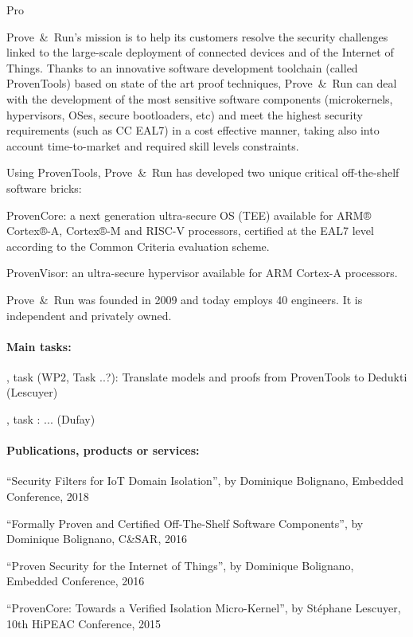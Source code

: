 \begin{sitedescription}{Pro}

\newcommand{\provenrun}[0]{Prove\ \&\ Run}


\provenrun's mission is to help its customers resolve the security
challenges linked to the large-scale deployment of connected devices
and of the Internet of Things. Thanks to an innovative software
development toolchain (called ProvenTools) based on state of the art
proof techniques, \provenrun{} can deal with the development of the
most sensitive software components (microkernels, hypervisors, OSes,
secure bootloaders, etc) and meet the highest security requirements
(such as CC EAL7) in a cost effective manner, taking also into account
time-to-market and required skill levels constraints.

Using ProvenTools, \provenrun{} has developed two unique critical
off-the-shelf software bricks:
\begin{compactitem}
\item ProvenCore: a next generation ultra-secure OS (TEE) available
  for ARM® Cortex®-A, Cortex®-M and RISC-V processors, certified at
  the EAL7 level according to the Common Criteria evaluation scheme.
\item ProvenVisor: an ultra-secure hypervisor available for ARM
  Cortex-A processors.
\end{compactitem}

\provenrun{} was founded in 2009 and today employs 40 engineers. It is
independent and privately owned.

\paragraph*{Main tasks:}

\begin{compactitem}
\item {}, task  (WP2, Task ..?): Translate models and proofs from ProvenTools to Dedukti (Lescuyer)
\item {}, task : ... (Dufay)
\end{compactitem}

\paragraph*{Publications, products or services:}

\begin{compactitem}
\item ``Security Filters for IoT Domain
  Isolation'', by Dominique Bolignano, Embedded Conference, 2018
\item ``Formally Proven and Certified
  Off-The-Shelf Software Components'', by Dominique Bolignano, C\&SAR,
  2016
\item ``Proven Security for the Internet of
  Things'', by Dominique Bolignano, Embedded Conference, 2016
\item ``ProvenCore: Towards a Verified Isolation
  Micro-Kernel'', by Stéphane Lescuyer, 10th HiPEAC Conference, 2015
\end{compactitem}


\end{sitedescription}
